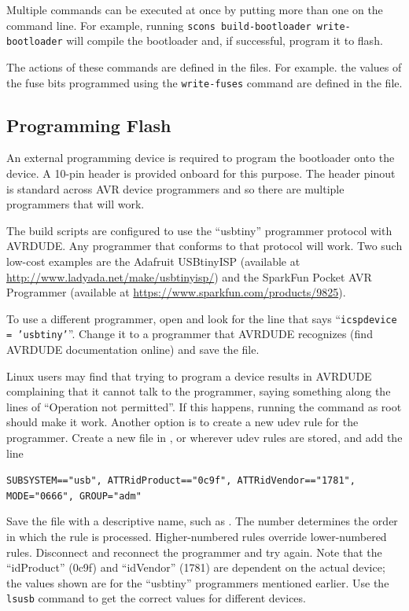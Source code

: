 \documentclass{article}
\begin{document}
Multiple commands can be executed at once by putting more than one on the command line.  For
example, running \texttt{scons build-bootloader write-bootloader} will compile the bootloader and,
if successful, program it to flash.

The actions of these commands are defined in the  files.  For example. the values
of the fuse bits programmed using the \texttt{write-fuses} command are defined in the
 file.

\subsection{Programming Flash} \label{ssec:FWProgFlash}
An external programming device is required to program the bootloader onto the device.  A 10-pin
header is provided onboard for this purpose.  The header pinout is standard across AVR device
programmers and so there are multiple programmers that will work.  

The build scripts are configured to use the ``usbtiny'' programmer protocol with AVRDUDE.  Any
programmer that conforms to that protocol will work.  Two such low-cost examples are the Adafruit
USBtinyISP (available at \url{http://www.ladyada.net/make/usbtinyisp/}) and the SparkFun Pocket AVR
Programmer (available at \url{https://www.sparkfun.com/products/9825}).

To use a different programmer, open  and look for the line
that says ``\texttt{icspdevice = 'usbtiny'}''.  Change it to a programmer that AVRDUDE recognizes (find
AVRDUDE documentation online) and save the file.

Linux users may find that trying to program a device results in AVRDUDE complaining that it cannot
talk to the programmer, saying something along the lines of ``Operation not permitted''.  If this
happens, running the command as root should make it work.  Another option is to create a new udev
rule for the programmer.  Create a new file in , or wherever udev rules
are stored, and add the line

\texttt{SUBSYSTEM=="usb", ATTR{idProduct}=="0c9f", ATTR{idVendor}=="1781", MODE="0666", GROUP="adm"}

Save the file with a descriptive name, such as .  The number determines the
order in which the rule is processed.  Higher-numbered rules override lower-numbered rules.
Disconnect and reconnect the programmer and try again.  Note that the ``idProduct'' (0c9f) and
``idVendor'' (1781) are dependent on the actual device; the values shown are for the ``usbtiny''
programmers mentioned earlier.  Use the \texttt{lsusb} command to get the correct values for
different devices.
\end{document}
